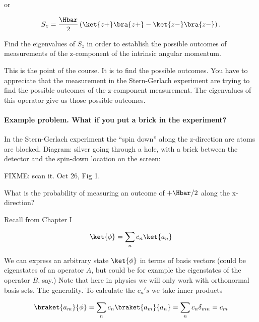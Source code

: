 or

\begin{equation}\label{eqn:PHY356Foct26:102}
\begin{aligned}
S_z = \frac{\Hbar}{2}
\left( \ket{z+}\bra{z+} - \ket{z-}\bra{z-} \right).
\end{aligned}
\end{equation}

Find the eigenvalues of \(S_z\) in order to establish the possible outcomes of measurements of the z-component of the intrinsic angular momentum.

This is the point of the course.  It is to find the possible outcomes.  You have to appreciate that the measurement in the Stern-Gerlach experiment are trying to find the possible outcomes of the z-component measurement.  The eigenvalues of this operator give us those possible outcomes.

\paragraph{Example problem.  What if you put a brick in the experiment?}

In the Stern-Gerlach experiment the ``spin down'' along the z-direction are atoms are blocked.  Diagram: silver going through a hole, with a brick between the detector and the spin-down location on the screen:

FIXME: scan it.  Oct 26, Fig 1.

What is the probability of measuring an outcome of \(+\Hbar/2\) along the x-direction?

Recall from Chapter I

\begin{equation}\label{eqn:PHY356Foct26:103}
\begin{aligned}
\ket{\phi} = \sum_n c_n \ket{a_n}
\end{aligned}
\end{equation}

We can express an arbitrary state \(\ket{\phi}\) in terms of basis vectors (could be eigenstates of an operator \(A\), but could be for example the eigenstates of the operator \(B\), say.)  Note that here in physics we will only work with orthonormal basis sets.  The generality.  To calculate the \(c_n's\) we take inner products

\begin{equation}\label{eqn:PHY356Foct26:104}
\begin{aligned}
\braket{a_m}{\phi} = \sum_n c_n \braket{a_m}{a_n} = \sum_n c_n \delta_{mn} = c_m
\end{aligned}
\end{equation}

